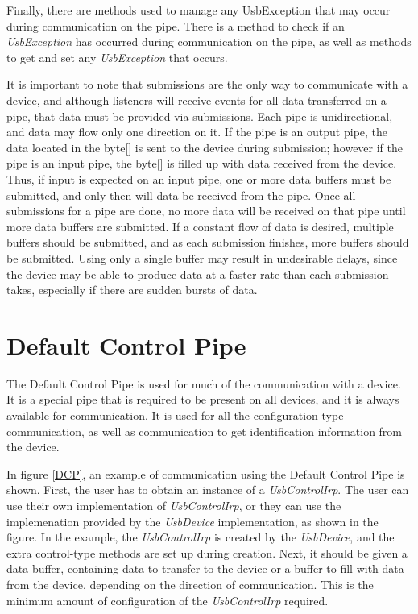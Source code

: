 \documentclass{article}
\newcommand{\myclass}[1]{\emph{#1}}
\newcommand{\myinterface}[1]{\emph{#1}}
\newcommand{\mysectionend}[0]{\vfill\pagebreak[1]}
\begin{document}
Finally, there are methods used to manage any UsbException that may occur during
communication on the pipe.  There is a method to check if an \myclass{UsbException} has
occurred during communication on the pipe, as well as methods to get and set any
\myclass{UsbException} that occurs.

It is important to note that submissions are the only way to communicate
with a device, and although listeners will receive events for all data
transferred on a pipe, that data must be provided via submissions.
Each pipe is unidirectional, and data may flow only one direction on it.
If the pipe is an output pipe, the data located in the byte[] is sent
to the device during submission; however if the pipe is an input pipe,
the byte[] is filled up with data received from the device.  Thus,
if input is expected on an input pipe, one or more data buffers
must be submitted, and only then will data be received from the pipe.
Once all submissions for a pipe are done, no more data will be received on
that pipe until more data buffers are submitted.  If a constant flow
of data is desired, multiple buffers should be submitted, and as each
submission finishes, more buffers should be submitted.  Using only
a single buffer may result in undesirable delays, since the device
may be able to produce data at a faster rate than each submission takes,
especially if there are sudden bursts of data.

\mysectionend

\pagebreak

%

\section{Default Control Pipe}

The Default Control Pipe is used for much of the communication with a device.
It is a special pipe that is required to be present on all devices, and it is
always available for communication.  It is used for all the configuration-type
communication, as well as communication to get identification information from
the device.

In figure \ref{DCP}, an example of communication using the Default Control Pipe
is shown.  First, the user has to obtain an instance of a \myinterface{UsbControlIrp}.  The
user can use their own implementation of \myinterface{UsbControlIrp}, or they can use the
implemenation provided by the \myinterface{UsbDevice} implementation, as shown in the figure.
In the example, the \myinterface{UsbControlIrp} is created by the \myinterface{UsbDevice}, and the extra
control-type methods are set up during creation.  Next, it should be given
a data buffer, containing data to transfer to the device or a buffer to
fill with data from the device, depending on the direction of communication.
This is the minimum amount of configuration of the \myinterface{UsbControlIrp} required.
\end{document}
